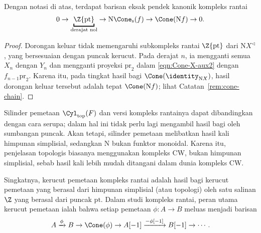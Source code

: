 \begin{proposition}\label{prop:Cone-comparison}
	Dengan notasi di atas, terdapat barisan eksak pendek kanonik kompleks
	rantai
	\[ 0 \to \underbracket{\Z\{\mathrm{pt}\}}_{\text{derajat nol}} \to \mathrm{N}\Cone_{\mathrm{s}}(f) \to \Cone(\mathrm{N}f) \to 0. \]
\end{proposition}
\begin{proof}
	Dorongan keluar tidak memengaruhi subkompleks rantai
	$\Z\{\mathrm{pt}\}$ dari $\mathrm{N}X^{\lhd}$, yang bersesuaian
	dengan puncak kerucut. Pada derajat $n$, ia mengganti semua $X_n$ dengan
	$Y_n$ dan mengganti proyeksi $\mathrm{pr}_2$ dalam
	\eqref{eqn:Cone-X-aux2} dengan $f_{n-1}\mathrm{pr}_2$. Karena itu, pada
	tingkat hasil bagi $\Cone(\identity_{\mathrm{N}X})$, hasil dorongan
	keluar tersebut adalah tepat $\Cone(\mathrm{N}f)$; lihat
	Catatan~\ref{rem:cone-chain}.
\end{proof}

\begin{remark}
	Silinder pemetaan $\Cyl_{\mathrm{top}}(F)$ dan versi kompleks rantainya
	dapat dibandingkan dengan cara serupa; dalam hal ini tidak perlu lagi
	mengambil hasil bagi oleh sumbangan puncak. Akan tetapi, silinder
	pemetaan melibatkan hasil kali himpunan simplisial, sedangkan
	$\mathrm{N}$ bukan funktor monoidal. Karena itu, penjelasan topologis
	biasanya menggunakan kompleks CW, bukan himpunan simplisial, sebab hasil
	kali lebih mudah ditangani dalam dunia kompleks CW.
\end{remark}

Singkatnya, kerucut pemetaan kompleks rantai adalah hasil bagi kerucut
pemetaan yang berasal dari himpunan simplisial (atau topologi) oleh satu
salinan $\Z$ yang berasal dari puncak $\mathrm{pt}$. Dalam studi kompleks
rantai, peran utama kerucut pemetaan ialah bahwa setiap pemetaan
$\phi:A\to B$ meluas menjadi barisan
\begin{equation}\label{eqn:cofiber-comparison-A}
	A \xrightarrow{\phi} B \to \Cone(\phi) \to A[-1] \xrightarrow{-\phi[-1]} B[-1] \to \cdots .
\end{equation}

